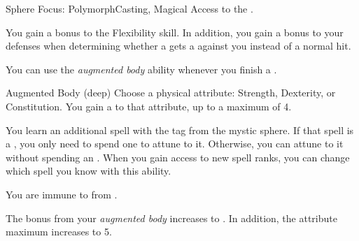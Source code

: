     \begin{feat}{Sphere Focus: Polymorph}{Casting, Magical}
        \featpre Access to the  .

         You gain a  bonus to the Flexibility skill.
        In addition, you gain a  bonus to your defenses when determining whether a  gets a  against you instead of a normal hit.

         You can use the \textit{augmented body} ability whenever you finish a .
        \begin{attuneability}{Augmented Body}{ (deep)}
            Choose a physical attribute: Strength, Dexterity, or Constitution.
            You gain a   to that attribute, up to a maximum of 4.
        \end{attuneability}

         You learn an additional spell with the  tag from the  mystic sphere.
        If that spell is a , you only need to spend one  to attune to it.
        Otherwise, you can attune to it without spending an .
        When you gain access to new spell ranks, you can change which spell you know with this ability.

         You are immune to  from .

         The bonus from your \textit{augmented body} increases to .
        In addition, the attribute maximum increases to 5.
    \end{feat}

